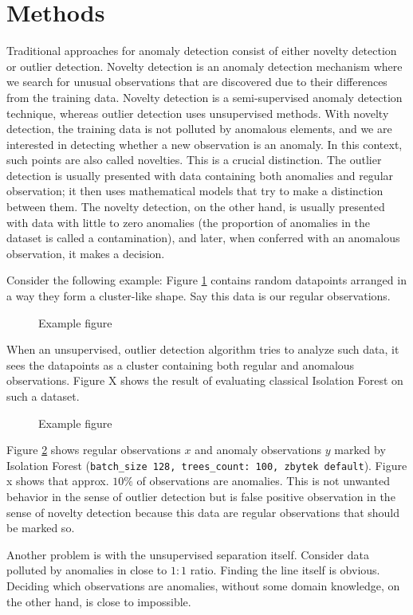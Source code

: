\section{Methods}
\label{sec:methods}
Traditional approaches for anomaly detection consist of either novelty
detection or outlier detection. Novelty detection is an anomaly
detection mechanism where we search for unusual observations that are
discovered due to their differences from the training data. Novelty
detection is a semi-supervised anomaly detection technique, whereas
outlier detection uses unsupervised methods. With novelty detection, the
training data is not polluted by anomalous elements, and we are
interested in detecting whether a new observation is an anomaly. In this context, such points are also called novelties. This is a crucial
distinction. The outlier detection is usually presented with data
containing both anomalies and regular observation; it then uses
mathematical models that try to make a distinction between them. The
novelty detection, on the other hand, is usually presented with data with
little to zero anomalies (the proportion of anomalies in the dataset is
called a contamination), and later, when conferred with an anomalous
observation, it makes a decision.

Consider the following example: Figure \ref{fig:example0} contains random datapoints
arranged in a way they form a cluster-like shape. Say this data is our
regular observations.

\begin{figure}[htbp]
\centering

\caption{Example figure}
\label{fig:example0}
\end{figure}

When an unsupervised, outlier detection algorithm tries to analyze such
data, it sees the datapoints as a cluster containing both regular and
anomalous observations. Figure X shows the result of evaluating
classical Isolation Forest on such a dataset.

\begin{figure}[htbp]
\centering

\caption{Example figure}
\label{fig:example05}
\end{figure}

Figure \ref{fig:example05} shows regular observations \(x\) and anomaly observations \(y\)
marked by Isolation Forest
(\texttt{batch\_size\ 128,\ trees\_count:\ 100,\ zbytek\ default}).
Figure x shows that approx. \(10\%\) of observations are anomalies. This
is not unwanted behavior in the sense of outlier detection but is false
positive observation in the sense of novelty detection because this
data are regular observations that should be marked so.

Another problem is with the unsupervised separation itself. Consider data polluted by anomalies in close to \(1:1\) ratio. Finding the line
itself is obvious. Deciding which observations are anomalies, without some domain knowledge, on the other hand, is close to impossible.